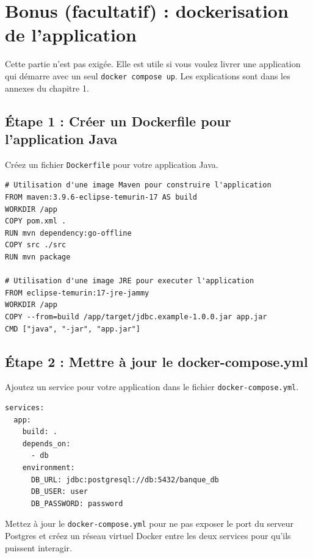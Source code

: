 \documentclass[11pt]{article}
\begin{document}
\section{Bonus (facultatif) : dockerisation de l'application}
Cette partie n'est pas exig\'ee. Elle est utile si vous voulez livrer une application qui d\'emarre
avec un seul \texttt{docker compose up}. Les explications sont dans les annexes du chapitre 1.

\subsection{Étape 1 : Créer un Dockerfile pour l'application Java}
Créez un fichier \texttt{Dockerfile} pour votre application Java.

\begin{lstlisting}
# Utilisation d'une image Maven pour construire l'application
FROM maven:3.9.6-eclipse-temurin-17 AS build
WORKDIR /app
COPY pom.xml .
RUN mvn dependency:go-offline
COPY src ./src
RUN mvn package

# Utilisation d'une image JRE pour executer l'application
FROM eclipse-temurin:17-jre-jammy
WORKDIR /app
COPY --from=build /app/target/jdbc.example-1.0.0.jar app.jar
CMD ["java", "-jar", "app.jar"]
\end{lstlisting}

\subsection{Étape 2 : Mettre à jour le docker-compose.yml}
Ajoutez un service pour votre application dans le fichier \texttt{docker-compose.yml}.

\begin{lstlisting}
services:
  app:
    build: .
    depends_on:
      - db
    environment:
      DB_URL: jdbc:postgresql://db:5432/banque_db
      DB_USER: user
      DB_PASSWORD: password
\end{lstlisting}

Mettez à jour le \texttt{docker-compose.yml} pour ne pas exposer le port du serveur Postgres et créez un réseau virtuel Docker entre les deux services pour qu'ils puissent interagir.
\end{document}
